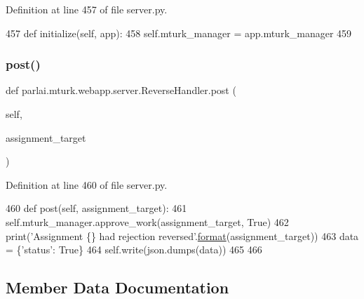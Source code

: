 Definition at line 457 of file server.\+py.


\begin{DoxyCode}
457     \textcolor{keyword}{def }initialize(self, app):
458         self.mturk\_manager = app.mturk\_manager
459 
\end{DoxyCode}
\mbox{\label{classparlai_1_1mturk_1_1webapp_1_1server_1_1ReverseHandler_a68457ba85cc4853cd5e1be1cbc05ca22}} 
\subsubsection{\texorpdfstring{post()}{post()}}
{\footnotesize\ttfamily def parlai.\+mturk.\+webapp.\+server.\+Reverse\+Handler.\+post (\begin{DoxyParamCaption}\item[{}]{self,  }\item[{}]{assignment\+\_\+target }\end{DoxyParamCaption})}



Definition at line 460 of file server.\+py.


\begin{DoxyCode}
460     \textcolor{keyword}{def }post(self, assignment\_target):
461         self.mturk\_manager.approve\_work(assignment\_target, \textcolor{keyword}{True})
462         print(\textcolor{stringliteral}{'Assignment \{\} had rejection reversed'}.\hyperlink{namespaceparlai_1_1chat__service_1_1services_1_1messenger_1_1shared__utils_a32e2e2022b824fbaf80c747160b52a76}{format}(assignment\_target))
463         data = \{\textcolor{stringliteral}{'status'}: \textcolor{keyword}{True}\}
464         self.write(json.dumps(data))
465 
466 
\end{DoxyCode}


\subsection{Member Data Documentation}
\mbox{\label{classparlai_1_1mturk_1_1webapp_1_1server_1_1ReverseHandler_a60664e4d71da9169afe68bd7b4f8a801}} 
